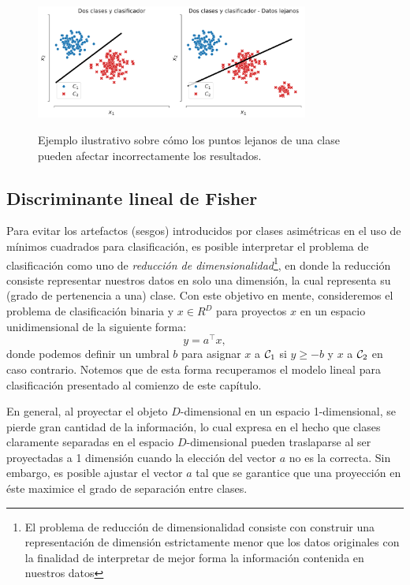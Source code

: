 \begin{figure}[H]
	\centering
	\includegraphics[width=0.8\textwidth]{img/cap2_dosclases_clasificador.pdf}\\
	\caption{Ejemplo ilustrativo sobre cómo los puntos lejanos de una clase pueden afectar incorrectamente los resultados.}
	\label{fig:clasif_mse}
\end{figure}

\subsection{Discriminante lineal de Fisher}

Para evitar los artefactos (sesgos) introducidos por clases  asimétricas en el uso de mínimos cuadrados para clasificación, es posible interpretar el problema de clasificación como uno de \emph{reducción de dimensionalidad}\footnote{El problema de reducción de dimensionalidad consiste con construir una representación de dimensión estrictamente menor que los datos originales con la finalidad de interpretar de mejor forma la información contenida en nuestros datos}, en donde la reducción consiste representar nuestros datos  en solo una dimensión, la cual representa su (grado de pertenencia a una) clase. Con este objetivo en mente, consideremos el problema de clasificación binaria y $x\in R^D$ para proyectos $x$ en un espacio unidimensional de la  siguiente forma:
\begin{equation}
	y = a^\top x,
\end{equation}
donde podemos definir un umbral $b$ para asignar $x$ a ${\mathcal C}_1$ si $y\geq-b$ y $x$ a ${\mathcal C}_2$ en caso contrario. Notemos que de esta forma recuperamos el modelo lineal para clasificación presentado al comienzo de este capítulo.

En general, al proyectar el objeto $D$-dimensional en un espacio  1-dimensional, se pierde gran cantidad de la información, lo cual expresa en el hecho que clases claramente separadas en el espacio $D$-dimensional pueden traslaparse al ser proyectadas a 1 dimensión cuando la elección del vector $a$ no es la correcta. Sin embargo, es posible ajustar el vector $a$ tal que se  garantice que una proyección en éste maximice el grado de separación entre clases.

